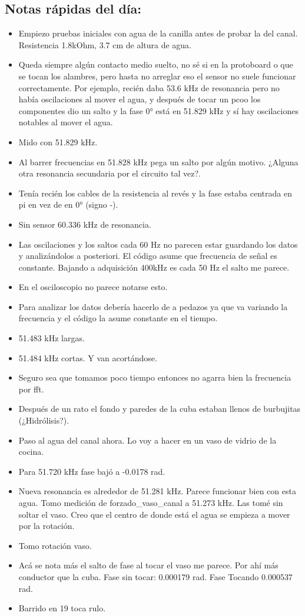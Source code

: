 \subsection*{Notas rápidas del día:}
\begin{itemize}
	\item Empiezo pruebas iniciales con agua de la canilla antes de probar la del canal. Resistencia 1.8kOhm, 3.7 cm de altura de agua. 
	\item Queda siempre algún contacto medio suelto, no sé si en la protoboard o que se tocan los alambres, pero hasta no arreglar eso el sensor no suele funcionar correctamente. Por ejemplo, recién daba 53.6 kHz de resonancia pero no había oscilaciones al mover el agua, y después de tocar un pcoo los componentes dio un salto y la fase 0° está en 51.829 kHz y sí hay oscilaciones notables al mover el agua.
	\item Mido con 51.829 kHz. 
	\item Al barrer frecuencias en 51.828 kHz pega un salto por algún motivo. ¿Alguna otra resonancia secundaria por el circuito tal vez?. 
	\item Tenía recién los cables de la resistencia al revés y la fase estaba centrada en pi en vez de en 0° (signo -). 
	\item Sin sensor 60.336 kHz de resonancia. 
	\item Las oscilaciones y los saltos cada 60 Hz no parecen estar guardando los datos y analizándolos a posteriori. El código asume que frecuencia de señal es constante. Bajando a adquisición 400kHz es cada 50 Hz el salto me parece. 
	\item En el osciloscopio no parece notarse esto. 
	\item Para analizar los datos debería hacerlo de a pedazos ya que va variando la frecuencia y el código la asume constante en el tiempo. 
	
	\item 51.483 kHz largas. 
	\item 51.484 kHz cortas. Y van acortándose. 
	\item Seguro sea que tomamos poco tiempo entonces no agarra bien la frecuencia por fft. 
	
	\item Después de un rato el fondo y paredes de la cuba estaban llenos de burbujitas (¿Hidrólisis?). 
	
	\item Paso al agua del canal ahora. Lo voy a hacer en un vaso de vidrio de la cocina. 
	\item Para 51.720 kHz fase bajó a -0.0178 rad. 
	\item  Nueva resonancia es alrededor de 51.281 kHz. Parece funcionar bien con esta agua. Tomo medición de forzado\_vaso\_canal a 51.273 kHz. Las tomé sin soltar el vaso. Creo que el centro de donde está el agua se empieza a mover por la rotación.
	\item Tomo rotación vaso. 
	\item Acá se nota más el salto de fase al tocar el vaso me parece. Por ahí más conductor que la cuba. Fase sin tocar: 0.000179 rad. Fase Tocando 0.000537 rad. 
	\item Barrido en 19 toca rulo. 
	

\end{itemize}
